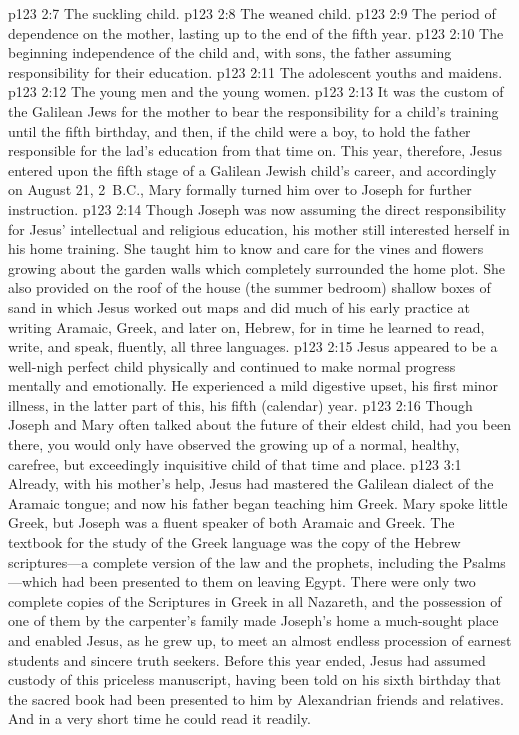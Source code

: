 \vs p123 2:7 \bibnobreakspace The suckling child.
\vs p123 2:8 \bibnobreakspace The weaned child.
\vs p123 2:9 \bibnobreakspace The period of dependence on the mother, lasting up to the end of the fifth year.
\vs p123 2:10 \bibnobreakspace The beginning independence of the child and, with sons, the father assuming responsibility for their education.
\vs p123 2:11 \bibnobreakspace The adolescent youths and maidens.
\vs p123 2:12 \bibnobreakspace The young men and the young women.
\pc \vs p123 2:13 It was the custom of the Galilean Jews for the mother to bear the responsibility for a child’s training until the fifth birthday, and then, if the child were a boy, to hold the father responsible for the lad’s education from that time on. This year, therefore, Jesus entered upon the fifth stage of a Galilean Jewish child’s career, and accordingly on August 21, 2~B.C., Mary formally turned him over to Joseph for further instruction.
\vs p123 2:14 Though Joseph was now assuming the direct responsibility for Jesus’ intellectual and religious education, his mother still interested herself in his home training. She taught him to know and care for the vines and flowers growing about the garden walls which completely surrounded the home plot. She also provided on the roof of the house (the summer bedroom) shallow boxes of sand in which Jesus worked out maps and did much of his early practice at writing Aramaic, Greek, and later on, Hebrew, for in time he learned to read, write, and speak, fluently, all three languages.
\vs p123 2:15 Jesus appeared to be a well\hyp{}nigh perfect child physically and continued to make normal progress mentally and emotionally. He experienced a mild digestive upset, his first minor illness, in the latter part of this, his fifth (calendar) year.
\vs p123 2:16 Though Joseph and Mary often talked about the future of their eldest child, had you been there, you would only have observed the growing up of a normal, healthy, carefree, but exceedingly inquisitive child of that time and place.
\vs p123 3:1 Already, with his mother’s help, Jesus had mastered the Galilean dialect of the Aramaic tongue; and now his father began teaching him Greek. Mary spoke little Greek, but Joseph was a fluent speaker of both Aramaic and Greek. The textbook for the study of the Greek language was the copy of the Hebrew scriptures---a complete version of the law and the prophets, including the Psalms---which had been presented to them on leaving Egypt. There were only two complete copies of the Scriptures in Greek in all Nazareth, and the possession of one of them by the carpenter’s family made Joseph’s home a much\hyp{}sought place and enabled Jesus, as he grew up, to meet an almost endless procession of earnest students and sincere truth seekers. Before this year ended, Jesus had assumed custody of this priceless manuscript, having been told on his sixth birthday that the sacred book had been presented to him by Alexandrian friends and relatives. And in a very short time he could read it readily.
